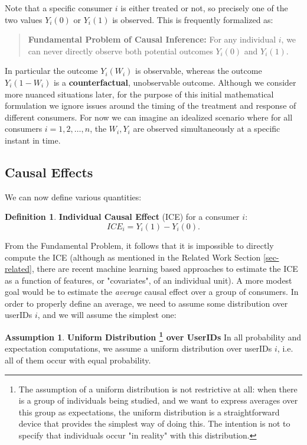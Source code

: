 \documentclass[11pt,a4paper]{article}
\theoremstyle{definition}
\newtheorem{definition}{Definition}[section]
\theoremstyle{remark}
\theoremstyle{definition}
\theoremstyle{definition}
\theoremstyle{definition}
\theoremstyle{definition}
\theoremstyle{definition}
\theoremstyle{definition}
\newtheorem{assumption}{Assumption
}[section]
\begin{document}
Note that a specific consumer $i$ is either treated or not, so precisely one of the two values $Y_i(0)$ or $Y_i(1)$ is observed. This is frequently formalized as:

\begin{quote}
	{\bf Fundamental Problem of Causal Inference:} For any individual $i$, we can never directly observe both potential outcomes $Y_i(0)$ and $Y_i(1)$. 
\end{quote}

   In particular the outcome $Y_i(W_i)$ is observable, whereas the outcome $Y_i(1 - W_i)$ is a {\bf counterfactual}, unobservable outcome. Although we consider more nuanced situations later, for the purpose of this initial mathematical formulation we ignore issues around the timing of the treatment and response of different consumers. For now we can imagine an idealized scenario where for all consumers $i = 1,2,\ldots,n$, the $W_i, Y_i$ are observed simultaneously at a specific instant in time. 

\subsection{Causal Effects}

We can now define various quantities:

	
\begin{definition}\label{ice}\small
{\bf Individual Causal Effect} (ICE) for a consumer $i$:
$$
ICE_i = Y_i(1) - Y_i(0).
$$
\end{definition}


From the Fundamental Problem, it follows that it is impossible to directly compute the ICE (although as mentioned in the Related Work Section \ref{sec-related}, there are recent machine learning based approaches to estimate the ICE as a function of features, or "covariates", of an individual unit). A more modest goal would be to estimate the \textit{average} causal effect over a group of consumers. In order to properly define an average, we need to assume some distribution over userIDs $i$, and we will assume the simplest one:

\begin{assumption}\small \textbf{Uniform Distribution
\footnote{The assumption of a uniform distribution is not restrictive at all: when there is a group of individuals being studied, and we want to express averages over this group as expectations, the uniform distribution is a straightforward device that provides the simplest way of doing this. The intention is not to specify that individuals occur "in reality" with this distribution.}
over UserIDs}
\label{ass-unif}
In all probability and expectation computations, we assume a uniform distribution over userIDs $i$, i.e. all of them occur with equal probability.
\end{assumption}
\end{document}
